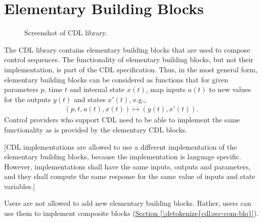 \documentclass[letterpaper,10pt, openany,english]{sphinxmanual}
\let\sphinxpxdimen\pdfpxdimen\else\newdimen\sphinxpxdimen
\begin{document}
\section{Elementary Building Blocks}
\label{\detokenize{cdl:elementary-building-blocks}}\label{\detokenize{cdl:sec-ele-bui-blo}}
\begin{figure}[htbp]
\centering
\capstart

\noindent\sphinxincludegraphics[width=300\sphinxpxdimen]{{cdl_screen_shot}.png}
\caption{Screenshot of CDL library.}\label{\detokenize{cdl:id2}}\end{figure}

The CDL library contains elementary building blocks that are used to compose
control sequences.
The functionality of elementary building blocks, but not their implementation,
is part of the CDL specification.
Thus, in the most general form, elementary building blocks can be considered
as functions that for given parameters \(p\),
time \(t\) and internal state \(x(t)\),
map inputs \(u(t)\) to new values for the
outputs \(y(t)\) and states \(x'(t)\), e.g.,
\begin{equation*}
\begin{split}(p, t, u(t), x(t)) \mapsto (y(t), x'(t)).\end{split}
\end{equation*}
Control providers who support CDL need to be able to implement the same
functionality as is provided by the elementary CDL blocks.

{[}CDL implementations are allowed to use a different implementation of the elementary
building blocks, because the implementation is language specific. However,
implementations shall have the same inputs, outputs and parameters, and
they shall compute the same response for the same value of inputs and state variables.{]}

Users are not allowed to add
new elementary building blocks. Rather, users can use them to implement
composite blocks (\hyperref[\detokenize{cdl:sec-com-blo}]{Section \ref{\detokenize{cdl:sec-com-blo}}}).
\end{document}
